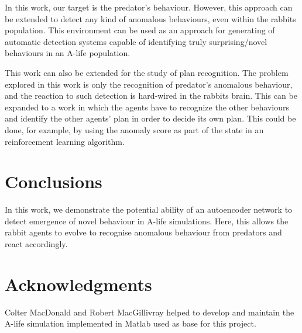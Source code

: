 \documentclass[letterpaper]{article}
\numberwithin{equation}{section}
\numberwithin{theorem}{section}
\numberwithin{lemma}{section}
\numberwithin{df}{section}
\begin{document}
In this work, our target is the predator's behaviour. However, this approach can be extended to detect any kind of anomalous behaviours, even within the rabbits population. This environment can be used as an approach for generating of automatic detection systems capable of identifying truly surprising/novel behaviours in an A-life population.

This work can also be extended for the study of plan recognition. The problem explored in this work is only the recognition of predator's anomalous behaviour, and the reaction to such detection is hard-wired in the rabbits brain. This can be expanded to a work in which the agents have to recognize the other behaviours and identify the other agents' plan in order to decide its own plan. This could be done, for example, by using the anomaly score as part of the state in an reinforcement learning algorithm.

\section{Conclusions}
In this work, we demonstrate the potential ability of an autoencoder network to detect emergence of novel behaviour in A-life simulations. Here, this allows the rabbit agents to evolve to recognise anomalous behaviour from predators and react accordingly.


\section*{Acknowledgments}

Colter MacDonald and Robert MacGillivray helped to develop and maintain the A-life simulation implemented in Matlab used as base for this project. 



\end{document}
